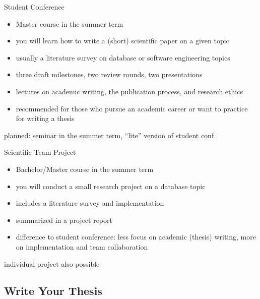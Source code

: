 \documentclass[
	aspectratio=169, %
	8pt, %
]{beamer}
\begin{document}
\begin{frame}{\myframetitle}
	\begin{mycolumns}
		\begin{note}{Student Conference}
			\begin{itemize}
				\item Master course in the summer term
				\item you will learn how to write a (short) scientific paper on a given topic
				\item usually a literature survey on database or software engineering topics
				\item three draft milestones, two review rounds, two presentations
				\item lectures on academic writing, the publication process, and research ethics
				\item recommended for those who pursue an academic career or want to practice for writing a thesis
			\end{itemize}
		\end{note}
		\begin{note}{}
			planned: seminar  in the summer term, ``lite'' version of student conf.
		\end{note}
	\mynextcolumn
		\begin{note}{Scientific Team Project \deutsch{Wiss. Teamprojekt}}
			\begin{itemize}
				\item Bachelor/Master course in the summer term
				\item you will conduct a small research project on a database topic
				\item includes a literature survey and implementation
				\item summarized in a project report
				\item difference to student conference: less focus on academic (thesis) writing, more on implementation and team collaboration
			\end{itemize}
		\end{note}
		\begin{note}{}
			individual project  also possible
		\end{note}
	\end{mycolumns}
\end{frame}

\subsection{Write Your Thesis}
\end{document}
